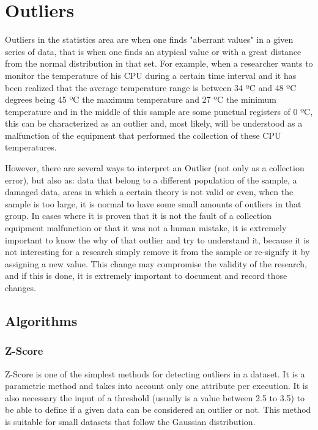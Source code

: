 \chapter{Outliers}


Outliers in the statistics area are when one finds "aberrant values" in a given
series of data, that is when one finds an atypical value or with a great distance
from the normal distribution in that set. For example, when a researcher wants to
monitor the temperature of his CPU during a certain time interval and it has been
realized that the average temperature range is between 34 ºC and 48 ºC degrees
being 45 ºC the maximum temperature and 27 ºC the minimum temperature and in the
middle of this sample are some punctual registers of 0 ºC, this can be characterized
as an outlier and, most likely, will be understood as a malfunction of the equipment
that performed the collection of these CPU temperatures.

However, there are several ways to interpret an Outlier (not only as a collection
error), but also as: data that belong to a different population of the sample, a
damaged data, areas in which a certain theory is not valid or even, when the sample
is too large, it is normal to have some small amounts of outliers in that group.
In cases where it is proven that it is not the fault of a collection equipment
malfunction or that it was not a human mistake, it is extremely important to know
the why of that outlier and try to understand it, because it is not interesting for
a research simply remove it from the sample or re-signify it by assigning a new
value. This change may compromise the validity of the research, and if this is
done, it is extremely important to document and record those changes.


\section{Algorithms}

\subsection{Z-Score}

Z-Score is one of the simplest methods for detecting outliers in a dataset. It is a
parametric method and takes into account only one attribute per execution. It is also
necessary the input of a threshold (usually is a value between 2.5 to 3.5) to be able
to define if a given data can be considered an outlier or not. This method is suitable
for small datasets that follow the Gaussian distribution.

